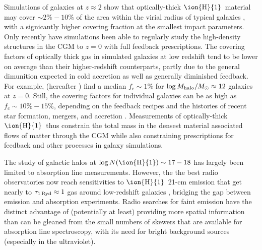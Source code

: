 \documentclass[12pt,preprint]{aastex6}
\newcommand{\HI}{\ensuremath{\mbox{\ion{H}{1}}}}
\newcommand{\logNHI}{\ensuremath{\log N(\mbox{\ion{H}{1}})}\relax}
\newcommand{\msun}{\ensuremath{M_\odot}\relax}
\begin{document}
Simulations of galaxies at $z\approx2$ show that optically-thick \HI\
material may cover $\sim2\% - 10\%$ of the area within the virial
radius of typical galaxies \citep[e.g.,][]{fumagalli2011a, cafg2011},
with a signicantly higher covering fraction at the smallest impact
parameters. Only recently have simulations been able to regularly
study the high-density structures in the CGM to $z=0$ with full
feedback prescriptions. The covering factors of optically thick gas in
simulated galaxies at low redshift tend to be lower on average than
their higher-redshift counterparts, partly due to the general
dimunition expected in cold accretion as well as generally diminished
feedback.  For example, \citealt{hafen2017} (hereafter
) find a median $f_c \sim 1\%$ for
$\log M_{\rm halo}/\msun \approx 12$ galaxies at $z=0$. Still, the
covering factors for individual galaxies can be as high as
$f_c \sim 10\% - 15\%$, depending on the feedback recipes and the
histories of recent star formation, mergers, and accretion
\citep[][]{gutcke2016}. Measurements of
optically-thick \HI\ thus constrain the total mass in the densest
material associated flows of matter through the CGM while also
constraining prescriptions for feedback and other processes in galaxy
simulations.

The study of galactic halos at $\logNHI \sim 17-18$ has largely been
limited to absorption line measurements. However, the the best radio
observatories now reach sensitivities to \HI\ 21-cm emission that get
nearly to $\tau_{\rm 1 \, Ryd} \approx 1$ gas around low-redshift
galaxies \citep[e.g.,][]{braun2004, lockman2012, wolfe2013,
  wolfe2016}, bridging the gap between emission and absorption
experiments. Radio searches for faint emission have the distinct
advantage of (potentially at least) providing more spatial information
than can be gleaned from the small numbers of skewers that are
available for absorption line spectroscopy, with its need for bright
background sources (especially in the ultraviolet).
\end{document}
